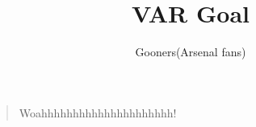 \documentclass[a4paper,12pt]{article}
\title{VAR Goal}
\author{Gooners(Arsenal fans)}
\date{}
\begin{document}
	
	\maketitle
	
	\begin{verse}
		
		Woahhhhhhhhhhhhhhhhhhhhh!
		
	\end{verse}
	
\end{document}
